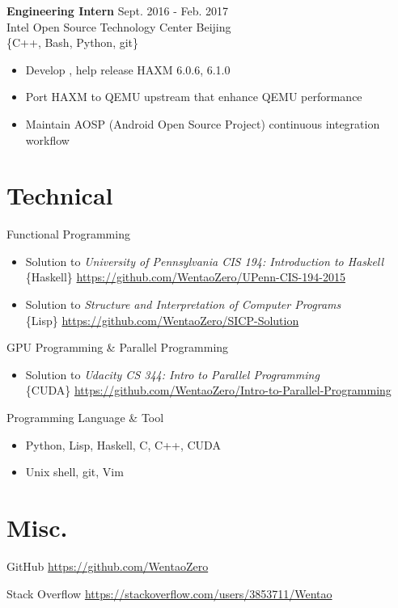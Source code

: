 \documentclass[margin, 10pt]{res} %
\begin{document}
\begin{resume}
{\bf Engineering Intern} \hfill Sept. 2016 - Feb. 2017\\
Intel Open Source Technology Center \hfill Beijing\\
{\fixedwidth\{C++, Bash, Python, git\}}

\begin{itemize}
	\item{Develop {\HAXMlink}}, help release HAXM 6.0.6, 6.1.0
	\item{Port HAXM to QEMU upstream that enhance QEMU performance}
	\item{Maintain AOSP (Android Open Source Project) continuous integration workflow}
\end{itemize}

\section{Technical}

Functional Programming

\begin{itemize}
	\item{Solution to {\it University of Pennsylvania CIS 194: Introduction to Haskell} \\
	{\fixedwidth\{Haskell\}} \hfill \url{https://github.com/WentaoZero/UPenn-CIS-194-2015}}
	\item{Solution to {\it Structure and Interpretation of Computer Programs}\\
	{\fixedwidth\{Lisp\}} \hfill \url{https://github.com/WentaoZero/SICP-Solution}}
\end{itemize}

GPU Programming \& Parallel Programming

\begin{itemize}
	\item{Solution to {\it Udacity CS 344: Intro to Parallel Programming} \\
	{\fixedwidth\{CUDA\}} \hfill \url{https://github.com/WentaoZero/Intro-to-Parallel-Programming}}
\end{itemize}

Programming Language \& Tool

\begin{itemize}
\item{\fixedwidth Python, Lisp, Haskell, C, C++, CUDA}
\item{\fixedwidth Unix shell, git, Vim}
\end{itemize}

\section{Misc.}

GitHub \hfill {\url{https://github.com/WentaoZero}}

{\vspace*{-0.5em}}

Stack Overflow \hfill {\url{https://stackoverflow.com/users/3853711/Wentao}}

\end{resume}
\end{document}
